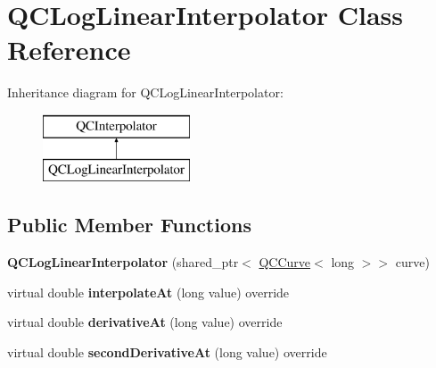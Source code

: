 \hypertarget{class_q_c_log_linear_interpolator}{\section{Q\+C\+Log\+Linear\+Interpolator Class Reference}
\label{class_q_c_log_linear_interpolator}
}
Inheritance diagram for Q\+C\+Log\+Linear\+Interpolator\+:\begin{figure}[H]
\begin{center}
\leavevmode
\includegraphics[height=2.000000cm]{class_q_c_log_linear_interpolator}
\end{center}
\end{figure}
\subsection*{Public Member Functions}
\begin{DoxyCompactItemize}
\item 
\hypertarget{class_q_c_log_linear_interpolator_a498be15254b804596bd1c8e3ef09efe5}{{\bfseries Q\+C\+Log\+Linear\+Interpolator} (shared\+\_\+ptr$<$ \hyperlink{class_q_c_curve}{Q\+C\+Curve}$<$ long $>$$>$ curve)}\label{class_q_c_log_linear_interpolator_a498be15254b804596bd1c8e3ef09efe5}

\item 
\hypertarget{class_q_c_log_linear_interpolator_aa19f97d5e9945707ea736557d24848c2}{virtual double {\bfseries interpolate\+At} (long value) override}\label{class_q_c_log_linear_interpolator_aa19f97d5e9945707ea736557d24848c2}

\item 
\hypertarget{class_q_c_log_linear_interpolator_a6eab6867f1f9bfe8efc9a0f43b8d4e08}{virtual double {\bfseries derivative\+At} (long value) override}\label{class_q_c_log_linear_interpolator_a6eab6867f1f9bfe8efc9a0f43b8d4e08}

\item 
\hypertarget{class_q_c_log_linear_interpolator_a5fd88a365a48f63d0a644677a12abf3f}{virtual double {\bfseries second\+Derivative\+At} (long value) override}\label{class_q_c_log_linear_interpolator_a5fd88a365a48f63d0a644677a12abf3f}

\end{DoxyCompactItemize}
